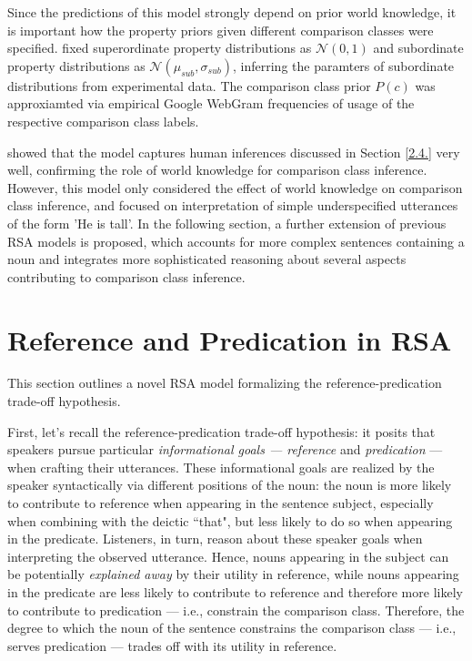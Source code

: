 Since the predictions of this model strongly depend on prior world knowledge, it is important how the property priors given different comparison classes were specified. \textcite{tessler2017warm} fixed superordinate property distributions as $\mathcal{N} (0, 1)$ and subordinate property distributions as $\mathcal{N}(\mu_{sub}, \sigma_{sub})$, inferring the paramters of subordinate distributions from experimental data. The comparison class prior $P(c)$ was approxiamted via empirical Google WebGram frequencies of usage of the respective comparison class labels. 

\textcite{tessler2017warm} showed that the model captures human inferences discussed in Section \ref{2.4.} very well, confirming the role of world knowledge for comparison class inference. 
However, this model only considered the effect of world knowledge on comparison class inference, and focused on interpretation of simple underspecified utterances of the form 'He is tall'. In the following section, a further extension of previous RSA models is proposed, which accounts for more complex sentences containing a noun and integrates more sophisticated reasoning about several aspects contributing to comparison class inference.  

\section{Reference and Predication in RSA}
This section outlines a novel RSA model formalizing the reference-predication trade-off hypothesis.

First, let's recall the reference-predication trade-off hypothesis: it posits that speakers pursue particular \emph{informational goals --- reference} and \emph{predication} --- when crafting their utterances. These informational goals are realized by the speaker syntactically via different positions of the noun: the noun is more likely to contribute to reference when appearing in the sentence subject, especially when combining with the deictic ``that", but less likely to do so when appearing in the predicate. Listeners, in turn, reason about these speaker goals when interpreting the observed utterance.  Hence, nouns appearing in the subject can be potentially \emph{explained away} by their utility in reference, while nouns appearing in the predicate  are less likely to contribute to reference and therefore more likely to contribute to predication --- i.e., constrain the comparison class. 
Therefore, the degree to which the noun of the sentence constrains the comparison class --- i.e., serves predication --- trades off with its utility in reference. 

